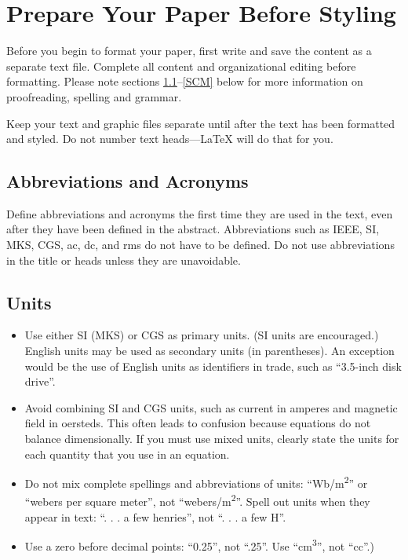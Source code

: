 \documentclass[conference]{IEEEtran}
\begin{document}
\section{Prepare Your Paper Before Styling}
Before you begin to format your paper, first write and save the content as a 
separate text file. Complete all content and organizational editing before 
formatting. Please note sections \ref{AA}--\ref{SCM} below for more information on 
proofreading, spelling and grammar.

Keep your text and graphic files separate until after the text has been 
formatted and styled. Do not number text heads---{\LaTeX} will do that 
for you.

\subsection{Abbreviations and Acronyms}\label{AA}
Define abbreviations and acronyms the first time they are used in the text, 
even after they have been defined in the abstract. Abbreviations such as 
IEEE, SI, MKS, CGS, ac, dc, and rms do not have to be defined. Do not use 
abbreviations in the title or heads unless they are unavoidable.

\subsection{Units}
\begin{itemize}
\item Use either SI (MKS) or CGS as primary units. (SI units are encouraged.) English units may be used as secondary units (in parentheses). An exception would be the use of English units as identifiers in trade, such as ``3.5-inch disk drive''.
\item Avoid combining SI and CGS units, such as current in amperes and magnetic field in oersteds. This often leads to confusion because equations do not balance dimensionally. If you must use mixed units, clearly state the units for each quantity that you use in an equation.
\item Do not mix complete spellings and abbreviations of units: ``Wb/m\textsuperscript{2}'' or ``webers per square meter'', not ``webers/m\textsuperscript{2}''. Spell out units when they appear in text: ``. . . a few henries'', not ``. . . a few H''.
\item Use a zero before decimal points: ``0.25'', not ``.25''. Use ``cm\textsuperscript{3}'', not ``cc''.)
\end{itemize}
\end{document}
